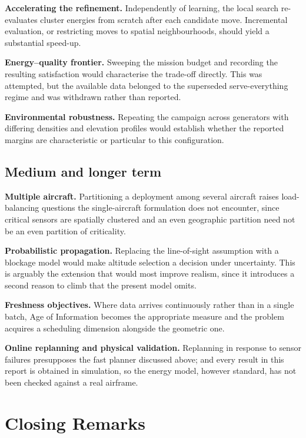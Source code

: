 \textbf{Accelerating the refinement.} Independently of learning, the local search re-evaluates cluster energies from scratch after each candidate move. Incremental evaluation, or restricting moves to spatial neighbourhoods, should yield a substantial speed-up.

\textbf{Energy--quality frontier.} Sweeping the mission budget and recording the resulting satisfaction would characterise the trade-off directly. This was attempted, but the available data belonged to the superseded serve-everything regime and was withdrawn rather than reported.

\textbf{Environmental robustness.} Repeating the campaign across generators with differing densities and elevation profiles would establish whether the reported margins are characteristic or particular to this configuration.

\subsection{Medium and longer term}

\textbf{Multiple aircraft.} Partitioning a deployment among several aircraft raises load-balancing questions the single-aircraft formulation does not encounter, since critical sensors are spatially clustered and an even geographic partition need not be an even partition of criticality.

\textbf{Probabilistic propagation.} Replacing the line-of-sight assumption with a blockage model would make altitude selection a decision under uncertainty. This is arguably the extension that would most improve realism, since it introduces a second reason to climb that the present model omits.

\textbf{Freshness objectives.} Where data arrives continuously rather than in a single batch, Age of Information \cite{kaul2012real} becomes the appropriate measure and the problem acquires a scheduling dimension alongside the geometric one.

\textbf{Online replanning and physical validation.} Replanning in response to sensor failures presupposes the fast planner discussed above; and every result in this report is obtained in simulation, so the energy model, however standard, has not been checked against a real airframe.

\section{Closing Remarks}

